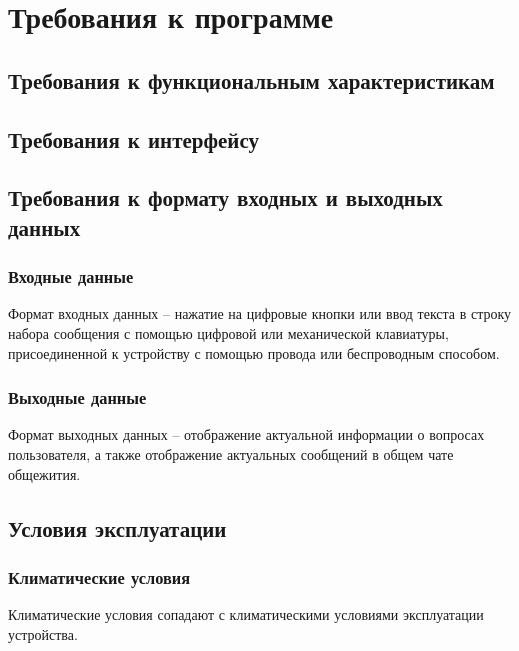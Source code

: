\section{Требования к программе}

\subsection{Требования к функциональным характеристикам}



\subsection{Требования к интерфейсу}



\subsection{Требования к формату входных и выходных данных}

\subsubsection{Входные данные}

Формат входных данных -- нажатие на цифровые кнопки или ввод текста в строку набора сообщения с помощью цифровой или механической клавиатуры, присоединенной к устройству с помощью провода или беспроводным способом.

\subsubsection{Выходные данные}

Формат выходных данных -- отображение актуальной информации о вопросах пользователя, а также отображение актуальных сообщений в общем чате общежития.

\subsection{Условия эксплуатации}

\subsubsection{Климатические условия}

Климатические условия сопадают с климатическими условиями эксплуатации устройства.

